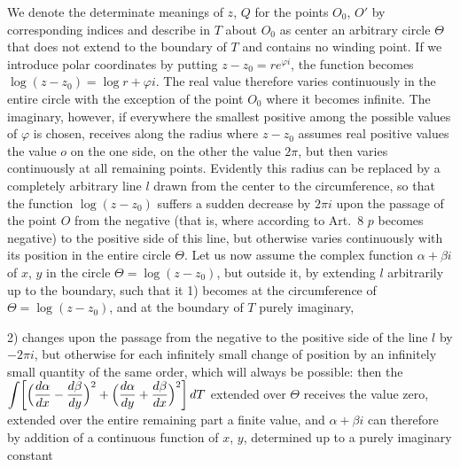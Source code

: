 \documentclass{article}
\begin{document}
We denote the determinate meanings of $z$, $Q$ for the points $O_0$, $O'$ by corresponding indices and describe in $T$ about $O_0$ as center an arbitrary circle $\varTheta$ that does not extend to the boundary of $T$ and contains no winding point. If we introduce polar coordinates by putting $z - z_0 = r e^{\varphi i}$, the function becomes $\log(z - z_0) = \log r + \varphi i$. The real value therefore varies continuously in the entire circle with the exception of the point $O_0$ where it becomes infinite. The imaginary, however, if everywhere the smallest positive among the possible values of $\varphi$ is chosen, receives along the radius where $z - z_0$ assumes real positive values the value $o$ on the one side, on the other the value $2\pi$, but then varies continuously at all remaining points. Evidently this radius can be replaced by a completely arbitrary line $l$ drawn from the center to the circumference, so that the function $\log(z - z_0)$ suffers a sudden decrease by $2\pi i$ upon the passage of the point $O$ from the negative (that is, where according to Art.~8 $p$ becomes negative) to the positive side of this line, but otherwise varies continuously with its position in the entire circle $\varTheta$. Let us now assume the complex function $\alpha + \beta i$ of $x$, $y$ in the circle $\varTheta = \log(z - z_0)$, but outside it, by extending $l$ arbitrarily up to the boundary, such that it
1) becomes at the circumference of $\varTheta = \log(z - z_0)$, and at the boundary of $T$ purely imaginary,


2) changes upon the passage from the negative to the positive side of the line $l$ by $-2\pi i$, but otherwise for each infinitely small change of position by an infinitely small quantity of the same order,
which will always be possible: then the $\displaystyle\int \biggl[\Bigl(\frac{d\alpha}{dx} - \frac{d\beta}{dy}\Bigr)^2 + \Bigl(\frac{d\alpha}{dy} + \frac{d\beta}{dx}\Bigr)^2\biggr]\,dT$ extended over $\varTheta$ receives the value zero, extended over the entire remaining part a finite value, and $\alpha + \beta i$ can therefore by addition of a continuous function of $x$, $y$, determined up to a purely imaginary constant
\end{document}
